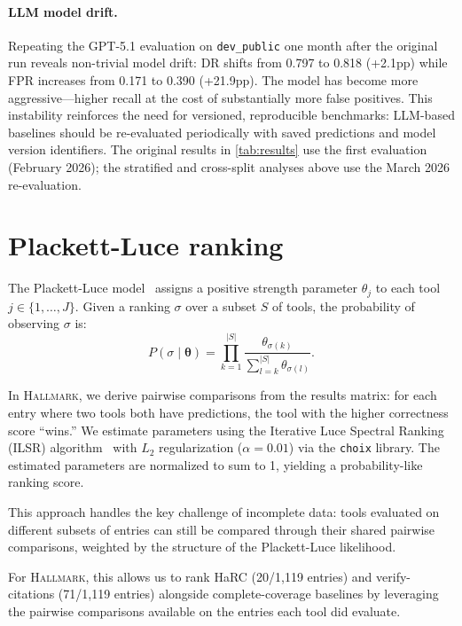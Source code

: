 \paragraph{LLM model drift.}
Repeating the GPT-5.1 evaluation on \texttt{dev\_public} one month after the original run reveals non-trivial model drift: DR shifts from 0.797 to 0.818 (+2.1pp) while FPR increases from 0.171 to 0.390 (+21.9pp).
The model has become more aggressive---higher recall at the cost of substantially more false positives.
This instability reinforces the need for versioned, reproducible benchmarks: LLM-based baselines should be re-evaluated periodically with saved predictions and model version identifiers.
The original results in \cref{tab:results} use the first evaluation (February 2026); the stratified and cross-split analyses above use the March 2026 re-evaluation.

\section{Plackett-Luce ranking}
\label{app:ranking}

The Plackett-Luce model~\citep{plackett1975,luce1959} assigns a positive strength parameter $\theta_j$ to each tool $j \in \{1, \ldots, J\}$.
Given a ranking $\sigma$ over a subset $S$ of tools, the probability of observing $\sigma$ is:
\begin{equation}
P(\sigma \mid \boldsymbol{\theta}) = \prod_{k=1}^{|S|} \frac{\theta_{\sigma(k)}}{\sum_{l=k}^{|S|} \theta_{\sigma(l)}}.
\end{equation}

In \textsc{Hallmark}, we derive pairwise comparisons from the results matrix: for each entry where two tools both have predictions, the tool with the higher correctness score ``wins.''
We estimate parameters using the Iterative Luce Spectral Ranking (ILSR) algorithm~\citep{maystre2015} with $L_2$ regularization ($\alpha = 0.01$) via the \texttt{choix} library.
The estimated parameters are normalized to sum to 1, yielding a probability-like ranking score.

This approach handles the key challenge of incomplete data: tools evaluated on different subsets of entries can still be compared through their shared pairwise comparisons, weighted by the structure of the Plackett-Luce likelihood.

For \textsc{Hallmark}, this allows us to rank HaRC (20/1,119 entries) and verify-citations (71/1,119 entries) alongside complete-coverage baselines by leveraging the pairwise comparisons available on the entries each tool did evaluate.

